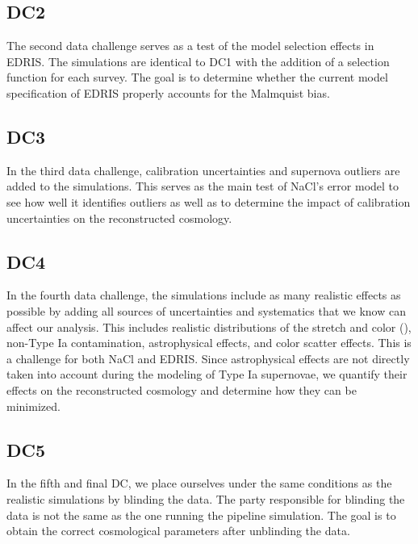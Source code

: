 \subsection{DC2}

The second data challenge serves as a test of the model selection effects in EDRIS. The simulations are identical to DC1 with the addition of a selection function 
for each survey. The goal is to determine whether the current model specification of EDRIS properly accounts for the Malmquist bias. \\


\subsection{DC3}

In the third data challenge, calibration uncertainties and supernova outliers are added to the simulations. This serves as the main test of NaCl's error model to see 
how well it identifies outliers as well as to determine the impact of calibration uncertainties on the reconstructed cosmology. \\


\subsection{DC4}

In the fourth data challenge, the simulations include as many realistic effects as possible by adding all sources of uncertainties and systematics that we know 
can affect our analysis. This includes realistic distributions of the stretch and color (\cite{Ginolin_2025_a, Ginolin_2025_b}), non-Type Ia contamination, astrophysical 
effects, and color scatter effects. This is a challenge for both NaCl and EDRIS. Since astrophysical effects are not directly taken into account 
during the modeling of Type Ia supernovae, we quantify their effects on the reconstructed cosmology and determine how they can be minimized. \\

\subsection{DC5}

In the fifth and final DC, we place ourselves under the same conditions as the realistic simulations by blinding the data. The party responsible for blinding the 
data is not the same as the one running the pipeline simulation. The goal is to obtain the correct cosmological parameters after unblinding the data. \\

